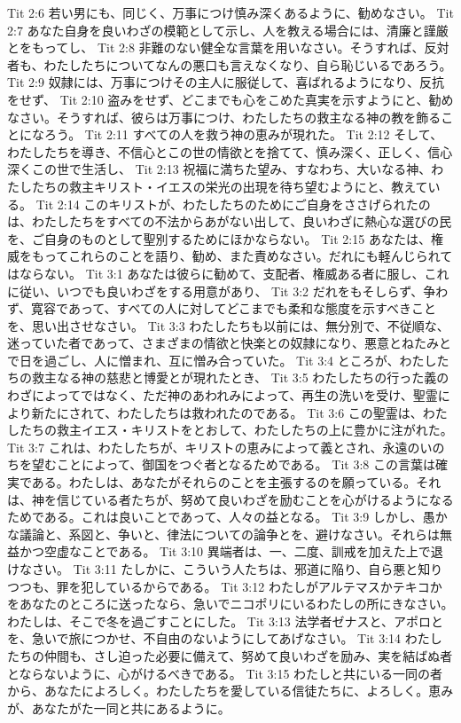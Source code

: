 Tit 2:6  若い男にも、同じく、万事につけ慎み深くあるように、勧めなさい。
Tit 2:7  あなた自身を良いわざの模範として示し、人を教える場合には、清廉と謹厳とをもってし、
Tit 2:8  非難のない健全な言葉を用いなさい。そうすれば、反対者も、わたしたちについてなんの悪口も言えなくなり、自ら恥じいるであろう。
Tit 2:9  奴隷には、万事につけその主人に服従して、喜ばれるようになり、反抗をせず、
Tit 2:10  盗みをせず、どこまでも心をこめた真実を示すようにと、勧めなさい。そうすれば、彼らは万事につけ、わたしたちの救主なる神の教を飾ることになろう。
Tit 2:11  すべての人を救う神の恵みが現れた。
Tit 2:12  そして、わたしたちを導き、不信心とこの世の情欲とを捨てて、慎み深く、正しく、信心深くこの世で生活し、
Tit 2:13  祝福に満ちた望み、すなわち、大いなる神、わたしたちの救主キリスト・イエスの栄光の出現を待ち望むようにと、教えている。
Tit 2:14  このキリストが、わたしたちのためにご自身をささげられたのは、わたしたちをすべての不法からあがない出して、良いわざに熱心な選びの民を、ご自身のものとして聖別するためにほかならない。
Tit 2:15  あなたは、権威をもってこれらのことを語り、勧め、また責めなさい。だれにも軽んじられてはならない。
Tit 3:1  あなたは彼らに勧めて、支配者、権威ある者に服し、これに従い、いつでも良いわざをする用意があり、
Tit 3:2  だれをもそしらず、争わず、寛容であって、すべての人に対してどこまでも柔和な態度を示すべきことを、思い出させなさい。
Tit 3:3  わたしたちも以前には、無分別で、不従順な、迷っていた者であって、さまざまの情欲と快楽との奴隷になり、悪意とねたみとで日を過ごし、人に憎まれ、互に憎み合っていた。
Tit 3:4  ところが、わたしたちの救主なる神の慈悲と博愛とが現れたとき、
Tit 3:5  わたしたちの行った義のわざによってではなく、ただ神のあわれみによって、再生の洗いを受け、聖霊により新たにされて、わたしたちは救われたのである。
Tit 3:6  この聖霊は、わたしたちの救主イエス・キリストをとおして、わたしたちの上に豊かに注がれた。
Tit 3:7  これは、わたしたちが、キリストの恵みによって義とされ、永遠のいのちを望むことによって、御国をつぐ者となるためである。
Tit 3:8  この言葉は確実である。わたしは、あなたがそれらのことを主張するのを願っている。それは、神を信じている者たちが、努めて良いわざを励むことを心がけるようになるためである。これは良いことであって、人々の益となる。
Tit 3:9  しかし、愚かな議論と、系図と、争いと、律法についての論争とを、避けなさい。それらは無益かつ空虚なことである。
Tit 3:10  異端者は、一、二度、訓戒を加えた上で退けなさい。
Tit 3:11  たしかに、こういう人たちは、邪道に陥り、自ら悪と知りつつも、罪を犯しているからである。
Tit 3:12  わたしがアルテマスかテキコかをあなたのところに送ったなら、急いでニコポリにいるわたしの所にきなさい。わたしは、そこで冬を過ごすことにした。
Tit 3:13  法学者ゼナスと、アポロとを、急いで旅につかせ、不自由のないようにしてあげなさい。
Tit 3:14  わたしたちの仲間も、さし迫った必要に備えて、努めて良いわざを励み、実を結ばぬ者とならないように、心がけるべきである。
Tit 3:15  わたしと共にいる一同の者から、あなたによろしく。わたしたちを愛している信徒たちに、よろしく。恵みが、あなたがた一同と共にあるように。


